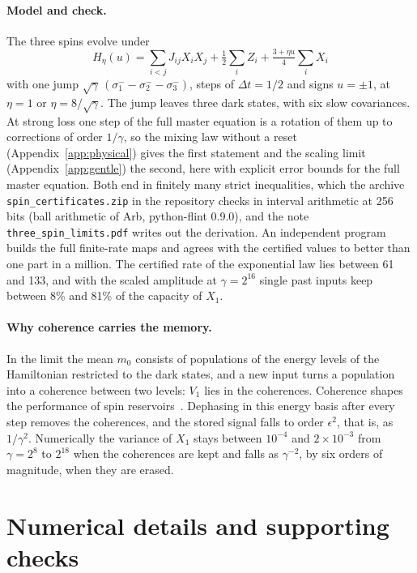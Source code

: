 \paragraph{Model and check.}
The three spins evolve under
\begin{equation}
  H_\eta(u)=\sum_{i<j}J_{ij}X_iX_j+\tfrac12\sum_iZ_i+\tfrac{3+\eta u}{4}\sum_iX_i
  \label{eq:H3}
\end{equation}
with one jump $\sqrt\gamma\,(\sigma_1^--\sigma_2^--\sigma_3^-)$, steps of $\Delta t=1/2$ and signs $u=\pm1$, at
$\eta=1$ or $\eta=8/\sqrt\gamma$. The jump leaves three dark states, with six slow covariances. At strong loss one
step of the full master equation is a rotation of them up to corrections of order $1/\gamma$, so the mixing law
without a reset (Appendix~\ref{app:physical}) gives the first statement and the scaling limit
(Appendix~\ref{app:gentle}) the second, here with explicit error bounds for the full master equation. Both end in
finitely many strict inequalities, which the archive \texttt{spin\_certificates.zip} in the repository checks in
interval arithmetic at 256 bits (ball arithmetic of Arb, python-flint 0.9.0), and the note
\texttt{three\_spin\_limits.pdf} writes out the derivation. An independent program builds the full finite-rate maps
and agrees with the certified values to better than one part in a million. The certified rate of the exponential law
lies between 61 and 133, and with the scaled amplitude at $\gamma=2^{16}$ single past inputs keep between 8\% and 81\% of the
capacity of $X_1$.

\paragraph{Why coherence carries the memory.}
In the limit the mean $m_0$ consists of populations of the energy levels of the Hamiltonian restricted to the dark
states, and a new input turns a population into a coherence between two levels: $V_1$ lies in the coherences.
Coherence shapes the performance of spin reservoirs~\cite{Palacios2024}. Dephasing in this energy basis after every
step removes the coherences, and the stored signal falls to order $\epsilon^2$, that is, as $1/\gamma^2$. Numerically the variance of $X_1$ stays between $10^{-4}$ and
$2\times10^{-3}$ from $\gamma=2^8$ to $2^{18}$ when the coherences are kept and falls as $\gamma^{-2}$, by six orders
of magnitude, when they are erased.

\section{Numerical details and supporting checks}
\label{app:numerics}
